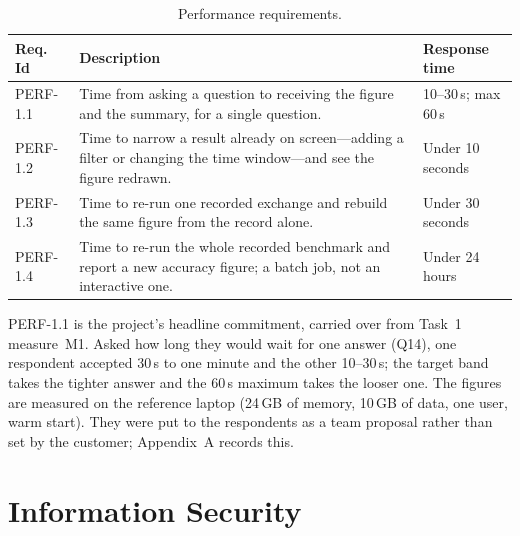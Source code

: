 \documentclass[12pt,a4paper]{report}
\begin{document}
\begin{table}[H]
  \centering
  \caption{Performance requirements.}
  \label{tab:perf}
  \setlength{\tabcolsep}{4.5pt}
  \begin{tabular}{@{}l >{\raggedright\arraybackslash}p{9.4cm} l@{}}
    \toprule[1.5pt]
    \textbf{Req. Id} & \textbf{Description} & \textbf{Response time} \\
    \midrule
    PERF-1.1 & Time from asking a question to receiving the figure and the
      summary, for a single question. & 10--30\,s; max 60\,s \\
    \addlinespace
    PERF-1.2 & Time to narrow a result already on screen---adding a filter
      or changing the time window---and see the figure redrawn.
      & Under 10 seconds \\
    \addlinespace
    PERF-1.3 & Time to re-run one recorded exchange and rebuild the same
      figure from the record alone. & Under 30 seconds \\
    \addlinespace
    PERF-1.4 & Time to re-run the whole recorded benchmark and report a new
      accuracy figure; a batch job, not an interactive one. & Under 24 hours \\
    \bottomrule[1.5pt]
  \end{tabular}
\end{table}

PERF-1.1 is the project's headline commitment, carried over from Task~1
measure~M1. Asked how long they would wait for one answer (Q14), one
respondent accepted 30\,s to one minute and the other 10--30\,s; the target
band takes the tighter answer and the 60\,s maximum takes the looser one. The
figures are measured on the reference laptop (24\,GB of memory, 10\,GB of
data, one user, warm start). They were put to the respondents as a team
proposal rather than set by the customer; Appendix~A records this.

\section{Information Security}
\label{sec:security}
\end{document}
